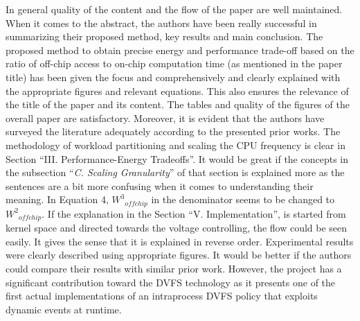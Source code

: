 \documentclass[11pt,letterpaper]{article}
\begin{document}
	In general quality of the content and the flow of the paper are well maintained. When it comes to the abstract, the authors have been really successful in summarizing their proposed method, key results and main conclusion. The proposed method to obtain precise energy and performance trade-off based on the ratio of off-chip access to on-chip computation time (as mentioned in the paper title) has been given the focus and comprehensively and clearly explained with the appropriate figures and relevant equations.  This also ensures the relevance of the title of the paper and its content. The tables and quality of the figures of the overall paper are satisfactory. Moreover, it is evident that the authors have surveyed the literature adequately according to the presented prior works. 	The methodology of workload partitioning and scaling the CPU frequency is clear in Section ``{\sc III. Performance-Energy Tradeoffs}''. It would be great if the concepts in the subsection ``\textit{C. Scaling Granularity}'' of that section is explained more as the sentences are a bit more confusing when it comes to understanding their meaning. In Equation 4,  ${W^3}_{offchip}$ in the denominator seems to be changed to ${W^2}_{offchip}$. If the explanation in the Section ``{\sc V. Implementation}'', is started from kernel space and directed towards the voltage controlling, the flow could be seen easily. It gives the sense that it is explained in reverse order. Experimental results were clearly described using appropriate figures. It would be better if the authors could compare their results with similar prior work. However, the project has a significant contribution toward the DVFS technology as it presents one of the first actual implementations of an intraprocess DVFS policy that exploits dynamic events at runtime.
	
	
	
	
	
\end{document}
